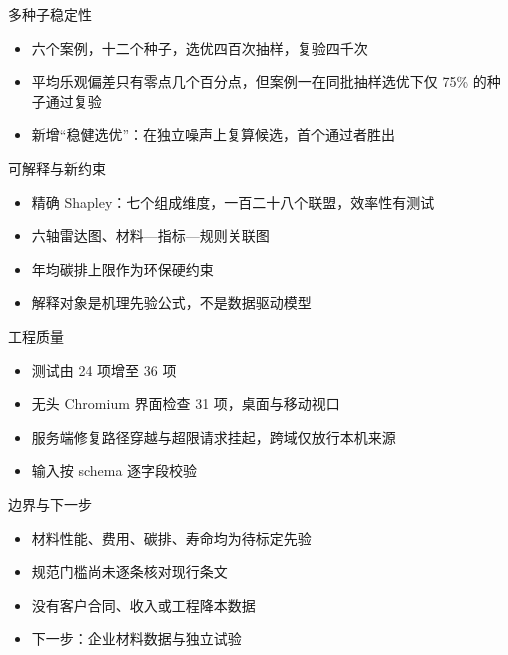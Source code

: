 \documentclass[UTF8,fontset=none,aspectratio=169,10pt]{ctexbeamer}
\begin{document}
\begin{frame}{多种子稳定性}\begin{itemize}\item 六个案例，十二个种子，选优四百次抽样，复验四千次\item 平均乐观偏差只有零点几个百分点，但案例一在同批抽样选优下仅 75\% 的种子通过复验\item 新增“稳健选优”：在独立噪声上复算候选，首个通过者胜出\end{itemize}\end{frame}
\begin{frame}{可解释与新约束}\begin{itemize}\item 精确 Shapley：七个组成维度，一百二十八个联盟，效率性有测试\item 六轴雷达图、材料—指标—规则关联图\item 年均碳排上限作为环保硬约束\item 解释对象是机理先验公式，不是数据驱动模型\end{itemize}\end{frame}
\begin{frame}{工程质量}\begin{itemize}\item 测试由 24 项增至 36 项\item 无头 Chromium 界面检查 31 项，桌面与移动视口\item 服务端修复路径穿越与超限请求挂起，跨域仅放行本机来源\item 输入按 schema 逐字段校验\end{itemize}\end{frame}
\begin{frame}{边界与下一步}\begin{itemize}\item 材料性能、费用、碳排、寿命均为待标定先验\item 规范门槛尚未逐条核对现行条文\item 没有客户合同、收入或工程降本数据\item 下一步：企业材料数据与独立试验\end{itemize}\end{frame}
\end{document}
